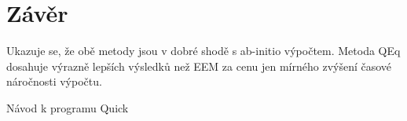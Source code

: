 \documentclass[
  color, %
  table, %
  lof,   %
  lot,   %
]{fithesis3}
\begin{document}
\chapter{Závěr}

Ukazuje se, že obě metody jsou v dobré shodě s ab-initio výpočtem. Metoda QEq dosahuje výrazně lepších výsledků než EEM za cenu jen mírného zvýšení časové náročnosti výpočtu.




%



\appendix

Návod k programu Quick

\end{document}
